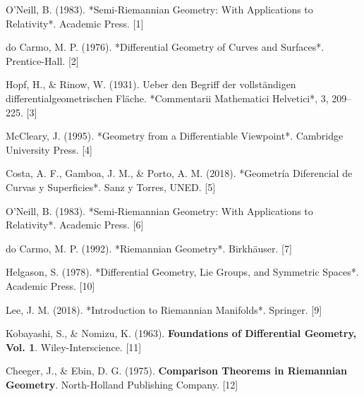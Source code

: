 \documentclass[12pt, a4paper]{report}
\theoremstyle{miestilo}
\theoremstyle{midefinicion}
\begin{document}
\begin{thebibliography}{9}

O'Neill, B. (1983). *Semi-Riemannian Geometry: With Applications to Relativity*. Academic Press. [1]

do Carmo, M. P. (1976). *Differential Geometry of Curves and Surfaces*. Prentice-Hall. [2]

Hopf, H., \& Rinow, W. (1931). Ueber den Begriff der vollständigen differentialgeometrischen Fläche. *Commentarii Mathematici Helvetici*, 3, 209–225. [3]

McCleary, J. (1995). *Geometry from a Differentiable Viewpoint*. Cambridge University Press. [4]

Costa, A. F., Gamboa, J. M., \& Porto, A. M. (2018). *Geometría Diferencial de Curvas y Superficies*. Sanz y Torres, UNED. [5]

O'Neill, B. (1983). *Semi-Riemannian Geometry: With Applications to Relativity*. Academic Press. [6]

do Carmo, M. P. (1992). *Riemannian Geometry*. Birkhäuser. [7]

Helgason, S. (1978). *Differential Geometry, Lie Groups, and Symmetric Spaces*. Academic Press. [10]

Lee, J. M. (2018). *Introduction to Riemannian Manifolds*. Springer. [9]

Kobayashi, S., & Nomizu, K. (1963). \textbf{Foundations of Differential Geometry, Vol. 1}. Wiley-Interscience. [11]

Cheeger, J., & Ebin, D. G. (1975). \textbf{Comparison Theorems in Riemannian Geometry}. North-Holland Publishing Company. [12]

\end{thebibliography}
\end{document}
